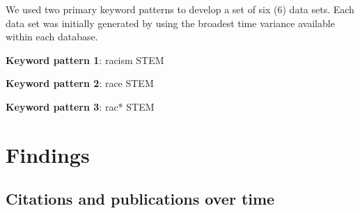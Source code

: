 We used two primary keyword patterns to develop a set of six (6) data sets. Each data set was initially generated by using the broadest time variance available within each database.

\noindent \textbf{Keyword pattern 1}: racism STEM

\noindent \textbf{Keyword pattern 2}: race STEM

\noindent \textbf{Keyword pattern 3}: rac* STEM



\section{Findings}
\label{sec:findings}

\subsection{Citations and publications over time}


%


